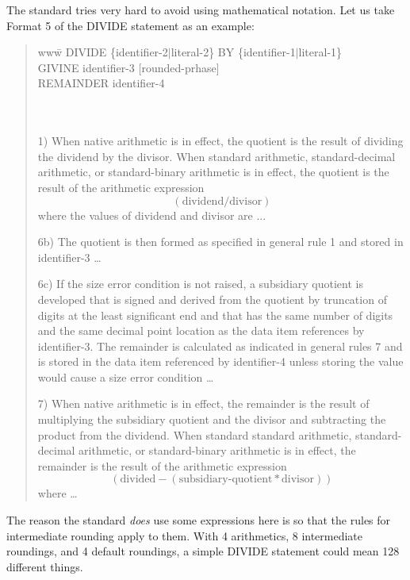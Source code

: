 \documentclass{article}
\begin{document}
The standard tries very hard to avoid using
mathematical notation.  Let us take Format 5 of the
DIVIDE statement as an example:
\begin{quote}
\begin{tabbing}
www\=\kill
DIVIDE \{identifier-2$|$literal-2\} BY \{identifier-1$|$literal-1\}\\
\> GIVINE identifier-3 [rounded-prhase]\\
\> REMAINDER identifier-4\\
\\
\\
\end{tabbing}

1) When native arithmetic is in effect, the quotient is the result
of dividing the dividend by the divisor.  When standard arithmetic,
standard-decimal arithmetic, or standard-binary arithmetic is in
effect, the quotient is the result of the arithmetic expression
$$(\mbox{dividend} / \mbox{divisor})$$
where the values of dividend and divisor are ...

6b) The quotient is then formed as specified in general rule 1
and stored in identifier-3 \dots

6c) If the size error condition is not raised, a subsidiary
quotient is developed that is signed and derived from the
quotient by truncation of digits at the least significant end
and that has the same number of digits and the same decimal point
location as the data item references by identifier-3.  The
remainder is calculated as indicated in general rules 7 and is
stored in the data item referenced by identifier-4 unless
storing the value would cause a size error condition \dots

7) When native arithmetic is in effect, the remainder is the
result of multiplying the subsidiary quotient and the divisor
and subtracting the product from the dividend.  When standard
standard arithmetic, standard-decimal arithmetic, or
standard-binary arithmetic is in effect, the remainder is the
result of the arithmetic expression
$$(\mbox{divided} - (\mbox{subsidiary-quotient} * \mbox{divisor}))$$
where \dots
\end{quote}

The reason the standard {\it does} use some expressions here is
so that the rules for intermediate rounding apply to them.  With
4 arithmetics, 8 intermediate roundings, and 4 default roundings,
a simple DIVIDE statement could mean 128 different things.
\end{document}

